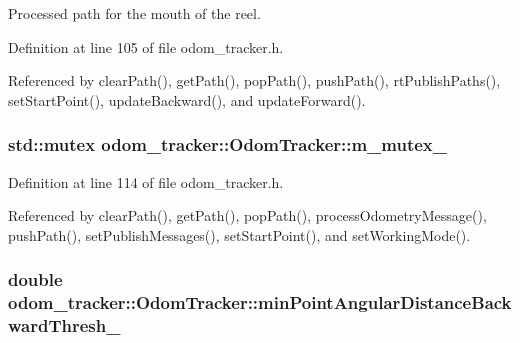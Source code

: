 Processed path for the mouth of the reel. 



Definition at line 105 of file odom\+\_\+tracker.\+h.



Referenced by clear\+Path(), get\+Path(), pop\+Path(), push\+Path(), rt\+Publish\+Paths(), set\+Start\+Point(), update\+Backward(), and update\+Forward().

\subsubsection[{\texorpdfstring{m\+\_\+mutex\+\_\+}{m_mutex_}}]{\setlength{\rightskip}{0pt plus 5cm}std\+::mutex odom\+\_\+tracker\+::\+Odom\+Tracker\+::m\+\_\+mutex\+\_\+\hspace{0.3cm}{\ttfamily [protected]}}\hypertarget{classodom__tracker_1_1OdomTracker_a17f1d82ae3d6441a4387af8fb83a3e20}{}\label{classodom__tracker_1_1OdomTracker_a17f1d82ae3d6441a4387af8fb83a3e20}


Definition at line 114 of file odom\+\_\+tracker.\+h.



Referenced by clear\+Path(), get\+Path(), pop\+Path(), process\+Odometry\+Message(), push\+Path(), set\+Publish\+Messages(), set\+Start\+Point(), and set\+Working\+Mode().

\subsubsection[{\texorpdfstring{min\+Point\+Angular\+Distance\+Backward\+Thresh\+\_\+}{minPointAngularDistanceBackwardThresh_}}]{\setlength{\rightskip}{0pt plus 5cm}double odom\+\_\+tracker\+::\+Odom\+Tracker\+::min\+Point\+Angular\+Distance\+Backward\+Thresh\+\_\+\hspace{0.3cm}{\ttfamily [protected]}}\hypertarget{classodom__tracker_1_1OdomTracker_a6b9214dccdd97870e2baf8ab51d47727}{}\label{classodom__tracker_1_1OdomTracker_a6b9214dccdd97870e2baf8ab51d47727}


